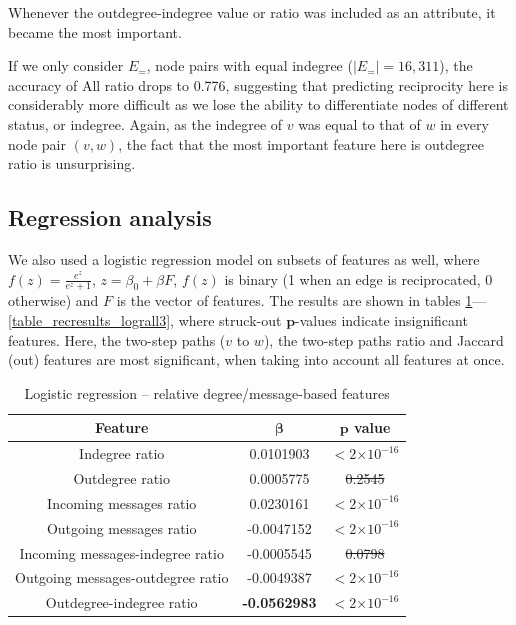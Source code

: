 \documentclass[conference]{IEEEtran}
\providecommand{\e}[1]{\ensuremath{\times 10^{#1}}}
\begin{document}
Whenever the outdegree-indegree value or ratio was included as an attribute, it became the most important.

If we only consider $E_=$, node pairs with equal indegree ($|E_=|=16,311$), the accuracy of All ratio drops to 0.776, suggesting that predicting reciprocity here is considerably more difficult as we lose the ability to differentiate nodes of different status, or indegree. 
Again, as the indegree of $v$ was equal to that of $w$ in every node pair $(v,w)$, the fact that the most important feature here is outdegree ratio is unsurprising.

\subsection{Regression analysis}
We also used a logistic regression model on subsets of features as well, where $f(z) = \frac{e^z}{e^z+1}$, $z = \beta_0 + \beta F$, $f(z)$ is binary (1 when an edge is reciprocated, 0 otherwise) and $F$ is the vector of features.
The results are shown in tables \ref{table_recresults_logr}---\ref{table_recresults_lograll3}, where struck-out $\mathbf{p}$-values indicate insignificant features. 
Here, the two-step paths ($v$ to $w$), the two-step paths ratio and Jaccard (out) features are most significant, when taking into account all features at once.


\begin{table}[!t]
\renewcommand{\arraystretch}{1.3}
\caption{Logistic regression -- relative degree/message-based features}
\label{table_recresults_logr}
\centering
\begin{tabular}{|c||c|c|}
\hline
\bf{Feature} & $\mathbf{\beta}$ & $\mathbf{p}$ value \\
\hline
Indegree ratio & 0.0101903 & $< 2 \e{-16} $ \\
Outdegree ratio & 0.0005775 & \sout{0.2545} \\
Incoming messages ratio & 0.0230161 & $< 2 \e{-16} $ \\
Outgoing messages ratio & -0.0047152 & $< 2 \e{-16} $ \\
Incoming messages-indegree ratio & -0.0005545 & \sout{0.0798} \\
Outgoing messages-outdegree ratio & -0.0049387 & $< 2 \e{-16} $ \\
Outdegree-indegree ratio & \bf{-0.0562983} & $< 2 \e{-16} $ \\
\hline
\end{tabular}
\end{table}
\end{document}

